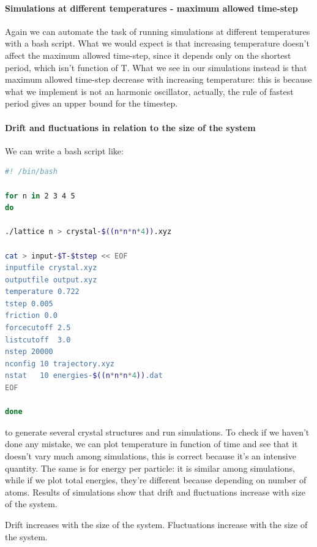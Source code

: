 \documentclass[a4paper, italian, openany]{book}
\begin{document}
\paragraph{Simulations at different temperatures - maximum allowed time-step}

Again we can automate the task of running simulations at different temperatures with a bash script.\newline
What we would expect is that increasing temperature doesn't affect the maximum allowed time-step, since it depends only on the shortest period, which isn't function of T. What we see in our simulations instead is that maximum allowed time-step decrease with increasing temperature: this is because what we implement is not an harmonic oscillator, actually, the rule of fastest period gives an upper bound for the timestep.

\paragraph{Drift and fluctuations in relation to the size of the system}

We can write a bash script like:

\begin{lstlisting}[language=bash]
#! /bin/bash

for n in 2 3 4 5
do

./lattice n > crystal-$((n*n*n*4)).xyz

cat > input-$T-$tstep << EOF
inputfile crystal.xyz
outputfile output.xyz
temperature 0.722
tstep 0.005
friction 0.0
forcecutoff 2.5
listcutoff  3.0
nstep 20000
nconfig 10 trajectory.xyz
nstat   10 energies-$((n*n*n*4)).dat
EOF

done
\end{lstlisting}

to generate several crystal structures and run simulations.\newline
To check if we haven't done any mistake, we can plot temperature in function of time and see that it doesn't vary much among simulations, this is correct because it's an intensive quantity. The same is for energy per particle: it is similar among simulations, while if we plot total energies, they're different because depending on number of atoms.\newline
Results of simulations show that drift and fluctuations increase with size of the system.

Drift increases with the size of the system. Fluctuations increase with the size of the system.
\end{document}
